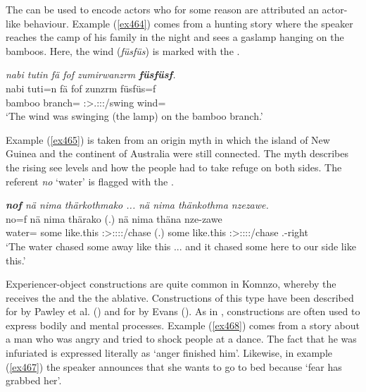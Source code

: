 The   can be used to encode  actors who for some reason are attributed an actor-like behaviour. Example (\ref{ex464}) comes from a hunting story where the speaker reaches the camp of his family in the night and sees a gaslamp hanging on the bamboos. Here, the wind (\emph{füsfüs}) is marked with the .

\begin{exe}
	\ex \emph{nabi tutin fä fof zumirwanzrm \textbf{füsfüsf}.}\\
	\gll nabi tuti=n fä fof zunzrm füsfüs=f\\
	bamboo branch=\Loc{} \Dist{} \Emph{} \Stsg:\Sbj>\Tsg.\F:\Obj:\Pst:\Dur/swing wind=\Erg{}\\
	\trans `The wind was swinging (the lamp) on the bamboo branch.'
	\label{ex464}
\end{exe}

Example (\ref{ex465}) is taken from an origin myth in which the island of New Guinea and the continent of Australia were still connected. The myth describes the rising see levels and how the people had to take refuge on both sides. The  referent \emph{no} `water' is flagged with the  .

\begin{exe}
	\ex \emph{\textbf{nof} nä nima thärkothmako ... nä nima thänkothma nzezawe.}\\
	\gll no=f nä nima thärako (.) nä nima thäna nze-zawe\\
	water=\Erg{} some {like.this} \Sg:\Sbj>\Stpl:\Obj:\Pst:\Pfv:\Andat/chase (.) some {like.this} \Stsg:\Sbj>\Stpl:\Obj:\Pst:\Pfv:\Venit/chase \Fnsg.\Poss-right\\
	\trans `The water chased some away like this ... and it chased some here to our side like this.'\\
	\label{ex465}
\end{exe}

Experiencer-object constructions are quite common in Komnzo, whereby the  receives the   and the  the ablative. Constructions of this type have been described for  by Pawley et al. (\citeyear{Pawley:2000vp}) and for  by Evans (\citeyear{Evans:2015wy}). As in ,  constructions are often used to express bodily and mental processes. Example (\ref{ex468}) comes from a story about a man who was angry and tried to shock people at a dance. The fact that he was infuriated is expressed literally as `anger finished him'. Likewise, in example (\ref{ex467}) the speaker announces that she wants to go to bed because `fear has grabbed her'. 

